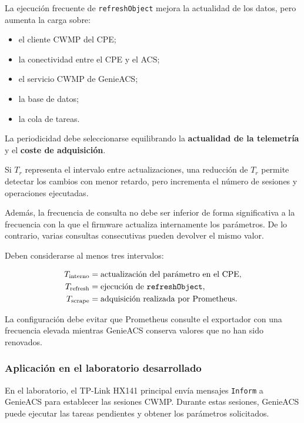 La ejecución frecuente de \texttt{refreshObject} mejora la actualidad de
los datos, pero aumenta la carga sobre:

\begin{itemize}
    \item el cliente CWMP del CPE;
    \item la conectividad entre el CPE y el ACS;
    \item el servicio CWMP de GenieACS;
    \item la base de datos;
    \item la cola de tareas.
\end{itemize}

La periodicidad debe seleccionarse equilibrando la
\textbf{actualidad de la telemetría} y el
\textbf{coste de adquisición}.

Si \(T_r\) representa el intervalo entre actualizaciones, una reducción
de \(T_r\) permite detectar los cambios con menor retardo, pero incrementa
el número de sesiones y operaciones ejecutadas.

Además, la frecuencia de consulta no debe ser inferior de forma
significativa a la frecuencia con la que el firmware actualiza
internamente los parámetros. De lo contrario, varias consultas
consecutivas pueden devolver el mismo valor.

Deben considerarse al menos tres intervalos:

\[
\begin{aligned}
    T_{\mathrm{interno}}
    &=
    \text{actualización del parámetro en el CPE},\\
    T_{\mathrm{refresh}}
    &=
    \text{ejecución de \texttt{refreshObject}},\\
    T_{\mathrm{scrape}}
    &=
    \text{adquisición realizada por Prometheus}.
\end{aligned}
\]

La configuración debe evitar que Prometheus consulte el exportador con
una frecuencia elevada mientras GenieACS conserva valores que no han sido
renovados.


\subsubsection*{Aplicación en el laboratorio desarrollado}

En el laboratorio, el TP-Link HX141 principal envía mensajes
\texttt{Inform} a GenieACS para establecer las sesiones CWMP. Durante
estas sesiones, GenieACS puede ejecutar las tareas pendientes y obtener
los parámetros solicitados.

